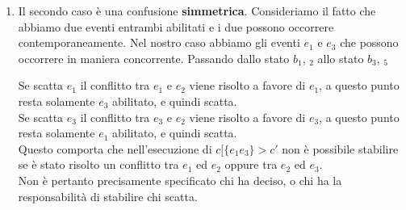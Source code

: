 \begin{enumerate}
\begin{itemize}
    \end{itemize}
    \item Il secondo caso è una confusione \textbf{simmetrica}. Consideriamo il fatto che abbiamo due eventi entrambi abilitati e i due possono occorrere contemporaneamente.
    Nel nostro caso abbiamo gli eventi $e_1$ e $e_3$ che possono occorrere in maniera concorrente. Passando dallo stato $b_1$, $_2$ allo stato $b_3$, $_5$
    \begin{center}
    \end{center}
    
    Se scatta $e_1$ il conflitto tra $e_1$ e $e_2$ viene risolto a favore di $e_1$, a questo punto resta solamente $e_3$ abilitato, e quindi scatta.\\
    Se scatta $e_3$ il conflitto tra $e_3$ e $e_2$ viene risolto a favore di $e_3$, a questo punto resta solamente $e_1$ abilitato, e quindi scatta.\\
    Questo comporta che nell'esecuzione di $c[\{e_1e_3\} > c'$ non è possibile stabilire se è stato risolto un conflitto tra $e_1$ ed $e_2$ oppure tra $e_2$ ed $e_3$.\\
    Non è pertanto precisamente specificato chi ha deciso, o chi ha la responsabilità di stabilire chi scatta. 
\end{enumerate} 

